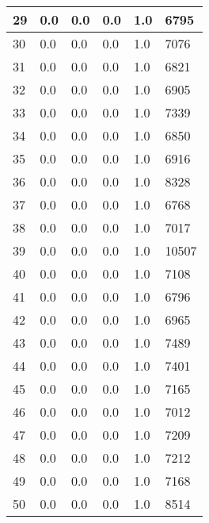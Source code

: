 \begin{longtable}{|l|l|l|l|l|l|}
29 & 0.0 & 0.0 & 0.0 & 1.0 & 6795 \\ \hline 
30 & 0.0 & 0.0 & 0.0 & 1.0 & 7076 \\ \hline 
31 & 0.0 & 0.0 & 0.0 & 1.0 & 6821 \\ \hline 
32 & 0.0 & 0.0 & 0.0 & 1.0 & 6905 \\ \hline 
33 & 0.0 & 0.0 & 0.0 & 1.0 & 7339 \\ \hline 
34 & 0.0 & 0.0 & 0.0 & 1.0 & 6850 \\ \hline 
35 & 0.0 & 0.0 & 0.0 & 1.0 & 6916 \\ \hline 
36 & 0.0 & 0.0 & 0.0 & 1.0 & 8328 \\ \hline 
37 & 0.0 & 0.0 & 0.0 & 1.0 & 6768 \\ \hline 
38 & 0.0 & 0.0 & 0.0 & 1.0 & 7017 \\ \hline 
39 & 0.0 & 0.0 & 0.0 & 1.0 & 10507 \\ \hline 
40 & 0.0 & 0.0 & 0.0 & 1.0 & 7108 \\ \hline 
41 & 0.0 & 0.0 & 0.0 & 1.0 & 6796 \\ \hline 
42 & 0.0 & 0.0 & 0.0 & 1.0 & 6965 \\ \hline 
43 & 0.0 & 0.0 & 0.0 & 1.0 & 7489 \\ \hline 
44 & 0.0 & 0.0 & 0.0 & 1.0 & 7401 \\ \hline 
45 & 0.0 & 0.0 & 0.0 & 1.0 & 7165 \\ \hline 
46 & 0.0 & 0.0 & 0.0 & 1.0 & 7012 \\ \hline 
47 & 0.0 & 0.0 & 0.0 & 1.0 & 7209 \\ \hline 
48 & 0.0 & 0.0 & 0.0 & 1.0 & 7212 \\ \hline 
49 & 0.0 & 0.0 & 0.0 & 1.0 & 7168 \\ \hline 
50 & 0.0 & 0.0 & 0.0 & 1.0 & 8514 \\ \hline 
\end{longtable}